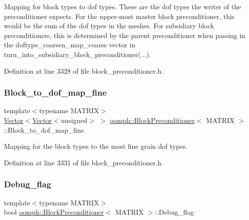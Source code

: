 Mapping for block types to dof types. These are the dof types the writer of the preconditioner expects. For the upper-\/most master block preconditioner, this would be the sum of the dof types in the meshes. For subsidiary block preconditioners, this is determined by the parent preconditioner when passing in the doftype\+\_\+coarsen\+\_\+map\+\_\+coarse vector in turn\+\_\+into\+\_\+subsidiary\+\_\+block\+\_\+preconditioner(...). 



Definition at line 3328 of file block\+\_\+preconditioner.\+h.

\mbox{\label{classoomph_1_1BlockPreconditioner_a278946969944848b12bdc2ceaed91a07}} 
\subsubsection{\texorpdfstring{Block\+\_\+to\+\_\+dof\+\_\+map\+\_\+fine}{Block\_to\_dof\_map\_fine}}
{\footnotesize\ttfamily template$<$typename M\+A\+T\+R\+IX$>$ \\
\hyperlink{classoomph_1_1Vector}{Vector}$<$\hyperlink{classoomph_1_1Vector}{Vector}$<$unsigned$>$ $>$ \hyperlink{classoomph_1_1BlockPreconditioner}{oomph\+::\+Block\+Preconditioner}$<$ M\+A\+T\+R\+IX $>$\+::Block\+\_\+to\+\_\+dof\+\_\+map\+\_\+fine\hspace{0.3cm}{\ttfamily [protected]}}



Mapping for the block types to the most fine grain dof types. 



Definition at line 3331 of file block\+\_\+preconditioner.\+h.

\mbox{\label{classoomph_1_1BlockPreconditioner_ab4647ea06ca7cf44c8de695ba35f3e97}} 
\subsubsection{\texorpdfstring{Debug\+\_\+flag}{Debug\_flag}}
{\footnotesize\ttfamily template$<$typename M\+A\+T\+R\+IX$>$ \\
bool \hyperlink{classoomph_1_1BlockPreconditioner}{oomph\+::\+Block\+Preconditioner}$<$ M\+A\+T\+R\+IX $>$\+::Debug\+\_\+flag\hspace{0.3cm}{\ttfamily [private]}}



